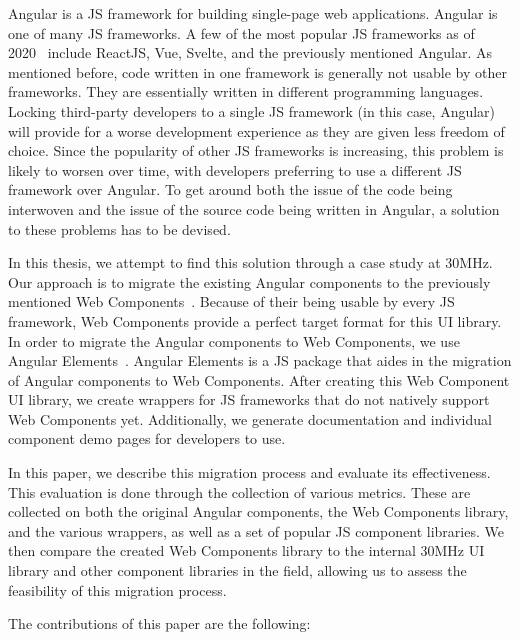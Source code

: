 Angular is a JS framework for building single-page web applications. Angular is one of many JS frameworks. A few of the most popular JS frameworks as of 2020~ include ReactJS, Vue, Svelte, and the previously mentioned Angular. As mentioned before, code written in one framework is generally not usable by other frameworks. They are essentially written in different programming languages. Locking third-party developers to a single JS framework (in this case, Angular) will provide for a worse development experience as they are given less freedom of choice. Since the popularity of other JS frameworks is increasing, this problem is likely to worsen over time, with developers preferring to use a different JS framework over Angular. To get around both the issue of the code being interwoven and the issue of the source code being written in Angular, a solution to these problems has to be devised.

In this thesis, we attempt to find this solution through a case study at 30MHz. Our approach is to migrate the existing Angular components to the previously mentioned Web Components~. Because of their being usable by every JS framework, Web Components provide a perfect target format for this UI library. In order to migrate the Angular components to Web Components, we use Angular Elements~. Angular Elements is a JS package that aides in the migration of Angular components to Web Components. After creating this Web Component UI library, we create wrappers for JS frameworks that do not natively support Web Components yet. Additionally, we generate documentation and individual component demo pages for developers to use.

In this paper, we describe this migration process and evaluate its effectiveness. This evaluation is done through the collection of various metrics. These are collected on both the original Angular components, the Web Components library, and the various wrappers, as well as a set of popular JS component libraries. We then compare the created Web Components library to the internal 30MHz UI library and other component libraries in the field, allowing us to assess the feasibility of this migration process.

The contributions of this paper are the following:

